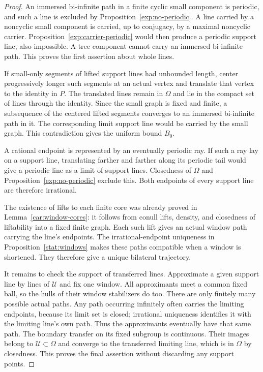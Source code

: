 \begin{proof}
An immersed bi-infinite path in a finite cyclic small component
is periodic, and such a line is excluded by
Proposition~\ref{exp:no-periodic}. A line carried by a noncyclic
small component is carried, up to conjugacy, by a maximal
noncyclic carrier. Proposition~\ref{exp:carrier-periodic} would
then produce a periodic support line, also impossible. A tree
component cannot carry an immersed bi-infinite path. This proves
the first assertion about whole lines.

If small-only segments of lifted support lines had unbounded
length, center progressively longer such segments at an actual
vertex and translate that vertex to the identity in $P$.
The translated lines remain in $\Omega$ and lie in the compact
set of lines through the identity. Since the small graph is
fixed and finite, a subsequence of the centered lifted segments
converges to an immersed bi-infinite path in it. The corresponding
limit support line would be carried by the small graph. This
contradiction gives the uniform bound $B_0$.

A rational endpoint is represented by an eventually periodic
ray. If such a ray lay on a support line, translating farther
and farther along its periodic tail would give a periodic line
as a limit of support lines. Closedness of $\Omega$ and
Proposition~\ref{exp:no-periodic} exclude this. Both endpoints
of every support line are therefore irrational.

The existence of lifts to each finite core was already proved
in Lemma~\ref{car:window-cores}: it follows from conull lifts,
density, and closedness of liftability into a fixed finite
graph. Each such lift gives an actual window path carrying the
line's endpoints. The irrational-endpoint uniqueness in
Proposition~\ref{stat:windows} makes these paths compatible when a
window is shortened. They therefore give a unique bilateral
trajectory.

It remains to check the support of transferred lines. Approximate
a given support line by lines of $\mathcal U$ and fix one
window. All approximants meet a common fixed ball, so the hulls
of their window stabilizers do too. There are only finitely many
possible actual paths. Any path occurring infinitely often
carries the limiting endpoints, because its limit set is
closed; irrational uniqueness identifies it with the limiting
line's own path. Thus the approximants eventually have that
same path. The boundary transfer on its fixed subgroup is
continuous. Their images belong to $\mathcal U\subset\Omega$
and converge to the transferred limiting line, which is in
$\Omega$ by closedness. This proves the final assertion without
discarding any support points.
\end{proof}

